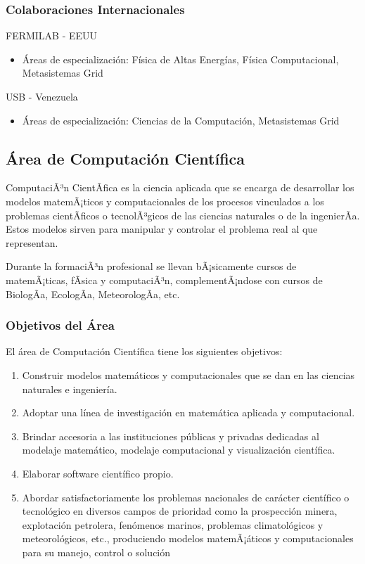 \subsubsection{Colaboraciones Internacionales}

FERMILAB - EEUU
\begin{itemize}
\item  \'Areas de especializaci\'on: F\'isica de Altas Energ\'ias, F\'isica Computacional, Metasistemas Grid 
\end{itemize}

USB - Venezuela
\begin{itemize}
\item  \'Areas de especializaci\'on: Ciencias de la Computaci\'on, Metasistemas Grid 
\end{itemize}


\subsection{\'Area de Computaci\'on Cient\'ifica}

ComputaciÃ³n CientÃ­fica es la ciencia aplicada que se encarga de desarrollar los modelos matemÃ¡ticos y computacionales de los procesos vinculados a los problemas cientÃ­ficos o tecnolÃ³gicos de las ciencias naturales o de la ingenierÃ­a. Estos modelos sirven para manipular y controlar el problema real al que representan.

Durante la formaciÃ³n profesional se llevan bÃ¡sicamente cursos de matemÃ¡ticas, fÃ­sica y computaciÃ³n, complementÃ¡ndose con cursos de BiologÃ­a, EcologÃ­a, MeteorologÃ­a, etc.

\subsubsection{Objetivos del \'Area}

El \'area de Computaci\'on Cient\'ifica tiene los siguientes objetivos: 
\begin{enumerate}
\item Construir modelos matem\'aticos y computacionales que se dan en las ciencias naturales e ingenier\'ia.
\item Adoptar una l\'inea de investigaci\'on en matem\'atica aplicada y computacional.
\item Brindar accesoria a las instituciones p\'ublicas y privadas dedicadas al modelaje matem\'atico, modelaje computacional y visualizaci\'on cient\'ifica.
\item Elaborar software cient\'ifico propio.
\item Abordar satisfactoriamente los problemas nacionales de car\'acter cient\'ifico o tecnol\'ogico en diversos campos de prioridad como la prospecci\'on minera, explotaci\'on petrolera, fen\'omenos marinos, problemas climatol\'ogicos y meteorol\'ogicos, etc., produciendo modelos matemÃ¡\'aticos y computacionales para su manejo, control o soluci\'on
\end{enumerate}

